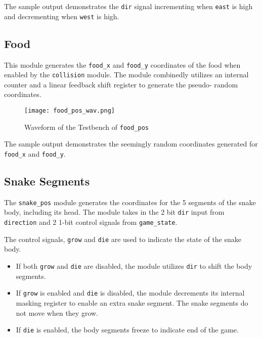\documentclass[paper=usletter, fontsize=12pt]{article}
\begin{document}
        The sample output demonstrates the \texttt{dir} signal incrementing
        when \texttt{east} is high and decrementing when \texttt{west} is high.

        \subsection{Food} This module generates the \texttt{food\_x} and
        \texttt{food\_y} coordinates of the food when enabled by the
        \texttt{collision} module. The module combinedly utilizes an internal
        counter and a linear feedback shift register to generate the pseudo-
        random coordinates.

        \begin{figure}[ht]
            \begin{center}
                \texttt{[image: food\_pos\_wav.png]}
                \caption{Waveform of the Testbench of \texttt{food\_pos}}
                \label{fig:food_pos_wav}
            \end{center}
        \end{figure}

        The sample output demonstrates the seemingly random coordinates
        generated for \texttt{food\_x} and \texttt{food\_y}.

        \subsection{Snake Segments} The \texttt{snake\_pos} module generates
        the coordinates for the 5 segments of the snake body, including its
        head. The module takes in the 2 bit \texttt{dir} input from
        \texttt{direction} and 2 1-bit control signals from
        \texttt{game\_state}.

        The control signals, \texttt{grow} and
        \texttt{die} are used to indicate the state of the snake body. 

        \begin{itemize}

            \item If both \texttt{grow} and \texttt{die} are disabled, the
            module utilizes \texttt{dir} to shift the body segments.

            \item If \texttt{grow} is enabled and \texttt{die} is disabled, the
            module decrements its internal masking register to enable an extra
            snake segment. The snake segments do not move when they grow.

            \item If \texttt{die} is enabled, the body segments freeze to
            indicate end of the game.

        \end{itemize}
\end{document}
